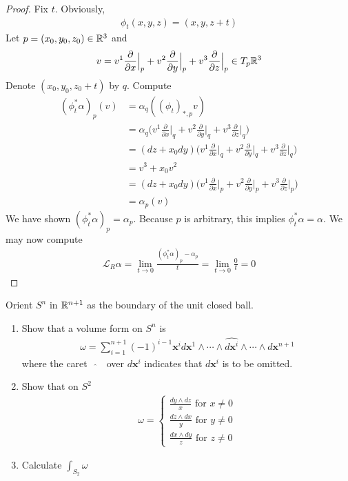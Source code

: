 \documentclass{report}
\begin{document}
\begin{proof}
Fix $t$. Obviously,  
\begin{align*}
\phi_t (x,y,z)= (x,y,z+t)
\end{align*}
Let $p=(x_0,y_0,z_0)\in\mathbb{R}^3$ and 
\begin{align*}
v= v^1\frac{\partial }{\partial x}\Big|_{p}+ v^2\frac{\partial }{\partial y}\Big|_{p}+v^3 \frac{\partial }{\partial z}\Big|_{p} \in T_p\mathbb{R}^3
\end{align*}
Denote $(x_0,y_0,z_0+t)$ by $q$.  Compute  
\begin{align*}
  (\phi_t^*\alpha )_{p}(v)&=\alpha_{q}((\phi_t)_{*,p}v)  \\
  &=\alpha_{q} \Big( v^1\frac{\partial }{\partial x}\Big|_{q}+ v^2\frac{\partial }{\partial y}\Big|_{q}+v^3 \frac{\partial }{\partial z}\Big|_{q} \Big) \\
  &= (dz+x_0dy) \Big( v^1\frac{\partial }{\partial x}\Big|_{q}+ v^2\frac{\partial }{\partial y}\Big|_{q}+v^3 \frac{\partial }{\partial z}\Big|_{q} \Big)  \\
  &= v^3 + x_0v^2\\
  &=(dz+x_0dy)\Big( v^1\frac{\partial }{\partial x}\Big|_{p}+ v^2\frac{\partial }{\partial y}\Big|_{p}+v^3 \frac{\partial }{\partial z}\Big|_{p}  \Big) \\
  &=\alpha_p (v)
\end{align*}
We have shown $(\phi_t^* \alpha )_p=\alpha _p$. Because $p$ is arbitrary, this implies  $\phi_t^*\alpha =\alpha $. We may now compute 
\begin{align*}
\mathcal{L}_R \alpha =\lim_{t\to 0} \frac{(\phi_t^*\alpha )_p-\alpha_p}{t}= \lim_{t\to 0} \frac{0}{t}=0
\end{align*}
\end{proof}
\begin{question}{}{}
Orient $S^n$ in  $\mathbb{R}^{n+1}$ as the boundary of the unit closed ball. 
\begin{enumerate}[label=(\alph*)]
  \item Show that a volume form on $S^n$ is 
     \begin{align*}
    \omega = \sum_{i=1}^{n+1}(-1)^{i-1}\textbf{x}^i d\textbf{x}^1 \wedge \cdots \wedge  \widehat{d\textbf{x}^i} \wedge  \cdots \wedge d\textbf{x}^{n+1}       
    \end{align*}
  where the caret $\text{  }\widehat{}\text{  }$ over $d\textbf{x}^i$ indicates that $d\textbf{x}^i$ is to be omitted. 
  \item Show that on $S^2$ 
 \begin{align*}
 \omega= \begin{cases}
   \frac{dy \wedge  dz}{x}\text{ for }x\neq 0\\
   \frac{dz \wedge  dx}{y}\text{ for }y\neq 0\\
   \frac{dx \wedge  dy}{z}\text{ for }z\neq 0
 \end{cases}
 \end{align*}
 \item Calculate $\int_{S_2}\omega$
\end{enumerate}
\end{question}
\end{document}
